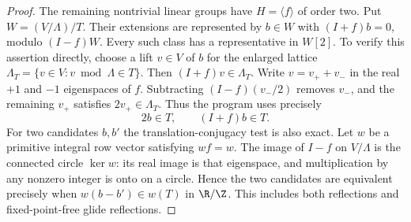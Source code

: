 \begin{proof}
The remaining nontrivial linear groups have $H=\langle f\rangle$
of order two.  Put $W=(V/\Lambda)/T$.  Their extensions are represented
by $b\in W$ with $(I+f)b=0$, modulo $(I-f)W$.  Every such class has a
representative in $W[2]$.  To verify this assertion directly, choose a
lift $v\in V$ of $b$ for the enlarged lattice
$\Lambda_T=\{v\in V:v\bmod\Lambda\in T\}$.
Then $(I+f)v\in\Lambda_T$.  Write
$v=v_++v_-$ in the real $+1$ and $-1$ eigenspaces of $f$.
Subtracting $(I-f)(v_-/2)$ removes $v_-$, and the remaining $v_+$
satisfies $2v_+\in\Lambda_T$.  Thus the program uses precisely
\[
              2b\in T,\qquad (I+f)b\in T.             \tag{B.27.3}
\]
For two candidates $b,b'$ the translation-conjugacy test is also exact.
Let $w$ be a primitive integral row vector satisfying $wf=w$.
The image of $I-f$ on $V/\Lambda$ is the connected circle $\ker w$:
its real image is that eigenspace, and multiplication by any nonzero
integer is onto on a circle.  Hence the two candidates are equivalent
precisely when $w(b-b')\in w(T)$ in $\R/\Z$.
This includes both reflections and fixed-point-free glide reflections.


\end{proof}
